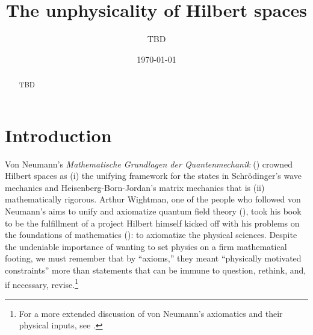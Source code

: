 \documentclass[10pt,twocolumn, nofootinbib]{revtex4-2}
\begin{document}
\title{The unphysicality of Hilbert spaces}
\author{TBD}

\date{\today}


\begin{abstract}
TBD
\end{abstract}

\maketitle

\section{Introduction}

Von Neumann's \textit{Mathematische Grundlagen der Quantenmechanik} (\citeyear{von_neumann_mathematische_1996}) crowned Hilbert spaces as (i) the unifying framework for the states in Schrödinger's wave mechanics and Heisenberg-Born-Jordan's matrix mechanics that is (ii) mathematically rigorous. Arthur Wightman, one of the people who followed von Neumann's aims to unify and axiomatize quantum field theory (\citeyear{wightman_quantum_1956}), took his book to be the fulfillment of a project Hilbert himself kicked off with his problems on the foundations of mathematics (\citeyear[p. 157]{browder_hilberts_1976}): to axiomatize the physical sciences. Despite the undeniable importance of wanting to set physics on a firm mathematical footing, we must remember that by ``axioms,'' they meant ``physically motivated constraints'' more than statements that can be immune to question, rethink, and, if necessary, revise.\footnote{For a more extended discussion of von Neumann's axiomatics and their physical inputs, see \citep{redei_soft_2006}.}\\
\end{document}
